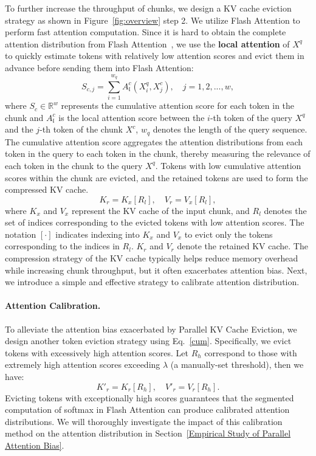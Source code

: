 To further increase the throughput of chunks, we design a KV cache eviction strategy as shown in Figure~\ref{fig:overview} step 2. We utilize Flash Attention to perform fast attention computation. Since it is hard to obtain the complete attention distribution from Flash Attention~\citep{dao2023flashattention}, we use the \textbf{local attention} of \( X^q \) to quickly estimate tokens with relatively low attention scores and evict them in advance before sending them into Flash Attention:
\begin{equation}
\label{cum}
S_{c,j} = \sum_{i=1}^{w_q} A^c_\mathfrak{l}(X^q_i, X^c_j), \quad j = 1, 2,...,w,
\end{equation}
where \( S_c \in \mathbb{R}^{w} \) represents the cumulative attention score for each token in the chunk and \( A^c_\mathfrak{l} \) is the local attention score between the \( i \)-th token of the query \( X^q \) and the \( j \)-th token of the chunk \( X^c \), \( w_q \) denotes the length of the query sequence. The cumulative attention score aggregates the attention distributions from each token in the query to each token in the chunk, thereby measuring the relevance of each token in the chunk to the query $X^q$. Tokens with low cumulative attention scores within the chunk are evicted, and the retained tokens are used to form the compressed KV cache.
\begin{equation}
K_r = K_x[R_l], \quad V_r = V_x[R_l],
\end{equation}
where \( K_x \) and \( V_x \) represent the KV cache of the input chunk, and \( R_l \) denotes the set of indices corresponding to the evicted tokens with low attention scores. The notation \( [\cdot] \) indicates indexing into \( K_x \) and \( V_x \) to evict only the tokens corresponding to the indices in \( R_l \). $K_r$ and $V_r$ denote the retained KV cache. The compression strategy of the KV cache typically helps reduce memory overhead while increasing chunk throughput, but it often exacerbates attention bias. Next, we introduce a simple and effective strategy to calibrate attention distribution.

\paragraph{Attention Calibration.} To alleviate the attention bias exacerbated by Parallel KV Cache Eviction, we design another token eviction strategy using Eq.~\ref{cum}. Specifically, we evict tokens with excessively high attention scores. Let \( R_h \) correspond to those with extremely high attention scores exceeding \( \lambda \) (a manually-set threshold), then we have:
\begin{equation}  
K'_r = K_r[R_h], \quad V'_r = V_r[R_h].  
\end{equation}  
 Evicting tokens with exceptionally high scores guarantees that the segmented computation of softmax in Flash Attention can produce calibrated attention distributions. We will thoroughly investigate the impact of this calibration method on the attention distribution in Section~\ref{Empirical Study of Parallel Attention Bias}.




